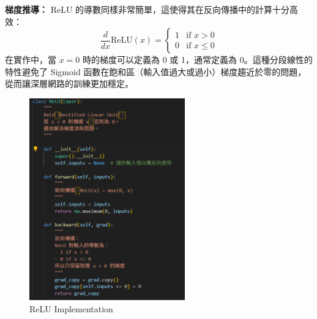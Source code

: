 \documentclass{article}
\begin{document}
\textbf{梯度推導：}
ReLU 的導數同樣非常簡單，這使得其在反向傳播中的計算十分高效：
\[
\frac{d}{dx} \text{ReLU}(x) =
\begin{cases}
1 & \text{if } x > 0 \\
0 & \text{if } x \le 0
\end{cases}
\]
在實作中，當 \(x=0\) 時的梯度可以定義為 0 或 1，通常定義為 0。這種分段線性的特性避免了 Sigmoid 函數在飽和區（輸入值過大或過小）梯度趨近於零的問題，從而讓深層網路的訓練更加穩定。

\begin{figure}[H]
    \centering
    \includegraphics[width=0.6\textwidth]{Lab01_report/img/6.2_relu.png}
    \caption{ReLU Implementation}
    \label{fig:relu_code}
\end{figure}
\end{document}
